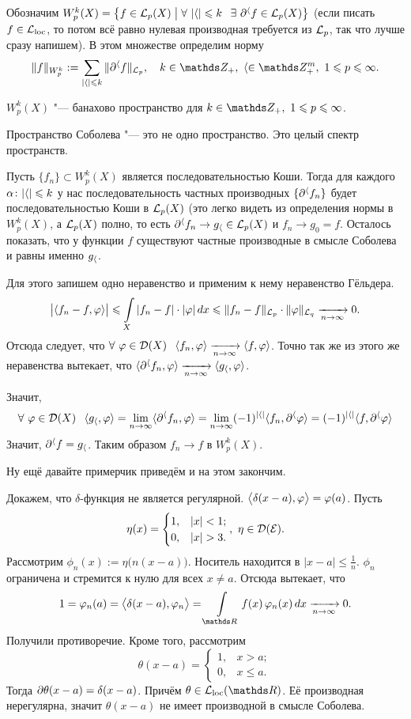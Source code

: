 Обозначим $W_p^k(X) = \big\{f\in\mathcal L_p(X)\bigm|\forall\ |\langle|\leqslant k\hskip .75em plus.1em minus.08em\relax \exists\ \partial^\langle f\in\mathcal L_p(X)\big\}$ (если писать $f\in\mathcal L_{\mathrm{loc}}$, то потом всё равно нулевая производная требуется из $\mathcal L_p$, так что лучше сразу напишем). В этом множестве определим норму
\[
  \|f\|_{W_p^k}:=\sum\limits_{|\a|\le k}\|\dl^\a f\|_{\L_p},\quad k\in\Z_+,\ \a\in\Z_+^m,\ 1\le p\le \infty.
\]
\begin{The}
	$W_p^k(X)$ "--- банахово пространство для $k\in\Z_+,\ 1\le p\le \infty$.
\end{The}
Пространство Соболева "--- это не одно пространство. Это целый спектр пространств.
\begin{Proof}
	Пусть $\{f_n\}\subset W_p^k(X)$ является последовательностью Коши. Тогда для каждого $\alpha\colon |\langle|\leqslant k$ у нас последовательность частных производных $\{\partial^\langle f_n\}$ будет последовательностью Коши в $\mathcal L_p(X)$ (это легко видеть из определения нормы в $W_p^k(X)$, а $\mathcal L_p(X)$ полно, то есть $\partial^\langle f_n\rightarrow g_\langle\in\mathcal L_p(X)$ и $f_n\to g_0=f$. Осталось показать, что у функции $f$ существуют частные производные в смысле Соболева и равны именно $g_\langle$.

	Для этого запишем одно неравенство и применим к нему неравенство Гёльдера.
\[
  \big|\langle f_n-f,\varphi\rangle\big|\leqslant \int\limits_{X}|f_n-f|\cdot|\varphi|\,dx\leqslant 
  \|f_n-f\|_{\mathcal L_p}\cdot \|\varphi\|_{\mathcal L_q}\xrightarrow[n\rightarrow\infty]{}0.
\]
Отсюда следует, что $\forall\ \varphi\in \mathcal D(X)\hskip .75em plus.1em minus.08em\relax \langle f_n,\varphi\rangle\xrightarrow[n\rightarrow\infty]{}\langle f,\varphi\rangle$. Точно так же из этого же неравенства вытекает, что $\langle \partial^\langle f_n,\varphi\rangle\xrightarrow[n\rightarrow\infty]{} \langle g_\langle,\varphi\rangle$.

Значит,
\[
  \forall\ \varphi\in \mathcal D(X)\hskip .75em plus.1em minus.08em\relax \langle g_\langle,\varphi\rangle = \lim\limits_{n\rightarrow\infty} \langle\partial^\langle f_n,\varphi\rangle = 
  \lim\limits_{n\rightarrow\infty} (-1)^{|\langle|}\langle f_n,\partial^\langle\varphi\rangle = 
  (-1)^{|\langle|}\langle f,\partial^\langle\varphi\rangle
\]
Значит, $\partial^\langle f = g_\langle$. Таким образом $f_n\to f$ в $W_p^k(X)$.
\end{Proof}
Ну ещё давайте примерчик приведём и на этом закончим.

Докажем, что $\delta$-функция не является регулярной. $\big\langle\delta(x-a),\varphi\big\rangle = \varphi(a)$. Пусть 
\[
	\eta(x) = \begin{cases}
		1,&|x|<1;\\
		0,&|x|>3.
	\end{cases},\ \eta\in\D(\E).
\]
Рассмотрим $\phi_n(x):=\eta\big(n(x-a)\big)$. Носитель находится в $|x-a|\le\frac1n$. $\phi_n$ ограничена и стремится к нулю для всех $x\ne a$. Отсюда вытекает, что\[
  1 = \phi_n(a) = \big\la \delta(x-a),\phi_n\big\ra = 
  \Gint{\R}f(x)\,\phi_n(x)\,dx\te 0.
\]
Получили противоречие. Кроме того, рассмотрим
\[
  \theta(x-a) = \begin{cases}
	  1,&x>a;\\
	  0,&x\le a.
  \end{cases}
\]
Тогда $\partial \theta(x-a) = \delta(x-a)$. Причём $\theta\in \Lloc(\R)$. Её производная нерегулярна, значит $\theta(x-a)$ не имеет производной в смысле Соболева.
